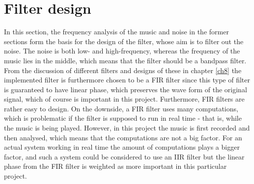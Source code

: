 \section{Filter design}
In this section, the frequency analysis of the music and noise in the former sections form the basis for the design of the filter, whose aim is to filter out the noise. The noise is both low- and high-frequency, whereas the frequency of the music lies in the middle, which means that the filter should be a bandpass filter. From the discussion of different filters and designs of these in chapter \ref{ch8} the implemented filter is furthermore chosen to be a FIR filter since this type of filter is guaranteed to have linear phase, which preserves the wave form of the original signal, which of course is important in this project. Furthermore, FIR filters are rather easy to design. On the downside, a FIR filter uses many computations, which is problematic if the filter is supposed to run in real time - that is, while the music is being played. However, in this project the music is first recorded and then analysed, which means that the computations are not a big factor. For an actual system working in real time the amount of computations plays a bigger factor, and such a system could be considered to use an IIR filter but the linear phase from the FIR filter is weighted as more important in this particular project.
